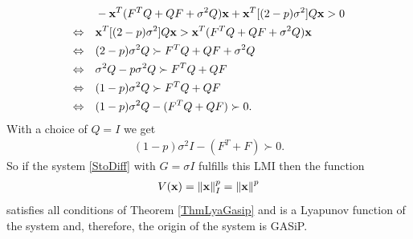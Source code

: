 \documentclass[a4paper,12pt,twoside,BCOR=10mm]{scrbook}
\begin{document}
\fi
\begin{align*}
    &-\mathbf{x}^T(F^TQ + QF + \sigma^2 Q)\mathbf{x} + \mathbf{x}^T [(2-p)\sigma^2]Q\mathbf{x} > 0 \\
    \Leftrightarrow \quad&\mathbf{x}^T [(2-p)\sigma^2]Q\mathbf{x} > \mathbf{x}^T(F^TQ + QF + \sigma^2 Q)\mathbf{x}\\
    \Leftrightarrow \quad& (2-p)\sigma^2Q \succ F^TQ + QF + \sigma^2 Q\\
    \Leftrightarrow \quad& \sigma^2 Q - p\sigma^2 Q \succ F^TQ + QF\\
    \Leftrightarrow \quad& (1 - p)\sigma^2 Q \succ  F^TQ + QF\\
    \Leftrightarrow \quad& (1 - p)\sigma^2Q - (F^TQ + QF) \succ 0.
\end{align*}
With a choice of $Q = I$ we get
\begin{align}\label{LMI diagonal noise}
    (1 - p)\sigma^2 I - (F^T + F) \succ 0.
\end{align}
So if the system \eqref{StoDiff} with $G = \sigma I$ fulfills this LMI then the function
\begin{align*}
    V(\mathbf{x}) = \left\lVert\mathbf{x}\right\rVert_{I}^{p} = \left\lVert\mathbf{x}\right\rVert^p 
\end{align*}
satisfies all conditions of Theorem \ref{ThmLyaGasip} and is a Lyapunov function of the system and, therefore, the origin of the system is GASiP.
\end{document}
